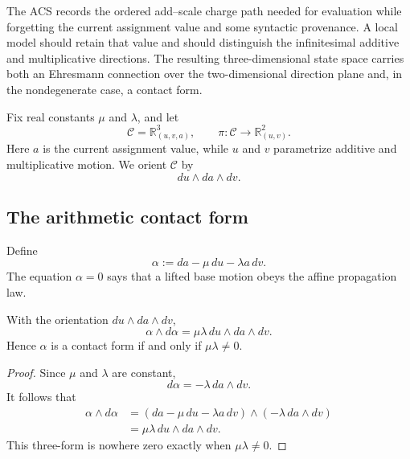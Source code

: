 The ACS records the ordered add--scale charge path needed for evaluation while
forgetting the current assignment value and some syntactic provenance.  A local
model should retain that value and should distinguish the infinitesimal additive
and multiplicative directions.  The resulting three-dimensional state space carries
both an Ehresmann connection over the two-dimensional direction plane and, in the
nondegenerate case, a contact form.

Fix real constants \(\mu\) and \(\lambda\), and let
\[
    \mathcal C=\mathbb R^3_{(u,v,a)},
    \qquad
    \pi:\mathcal C\longrightarrow\mathbb R^2_{(u,v)}.
\]
Here \(a\) is the current assignment value, while \(u\) and \(v\) parametrize
additive and multiplicative motion.  We orient \(\mathcal C\) by
\[
    du\wedge da\wedge dv.
\]

\subsection{The arithmetic contact form}

Define
\begin{equation}
    \alpha:=da-\mu\,du-\lambda a\,dv.
    \label{eq:arithmetic-contact-form}
\end{equation}
The equation \(\alpha=0\) says that a lifted base motion obeys the affine
propagation law.

\begin{proposition}
\label{prop:contact-form}
With the orientation \(du\wedge da\wedge dv\),
\begin{equation}
    \alpha\wedge d\alpha
       =\mu\lambda\,du\wedge da\wedge dv.
    \label{eq:contact-volume-sign}
\end{equation}
Hence \(\alpha\) is a contact form if and only if \(\mu\lambda\ne0\).
\end{proposition}

\begin{proof}
Since \(\mu\) and \(\lambda\) are constant,
\[
    d\alpha=-\lambda\,da\wedge dv.
\]
It follows that
\begin{align*}
    \alpha\wedge d\alpha
      &=(da-\mu\,du-\lambda a\,dv)
        \wedge(-\lambda\,da\wedge dv)\\
      &=\mu\lambda\,du\wedge da\wedge dv.
\end{align*}
This three-form is nowhere zero exactly when \(\mu\lambda\ne0\).
\end{proof}


